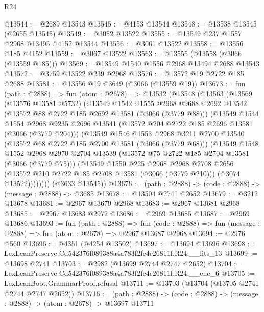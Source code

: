 \begin{lexlean}{R24}
\begin{coremodule}
@13544 := @2689 @13543
@13545 := @4153 @13544
@13548 := @13538 @13545 (@2655 @13545)
@13549 := @3052 @13522
@13555 := @13549 @237 @1557 @2968 @13495 @4152 @13544
@13556 := @3061 @13522
@13558 := @13556 @185 @4152
@13559 := @3067 @13522
@13563 := @13555 (@13558 (@3066 (@13559 @185)))
@13569 := @13549 @1540 @1556 @2968 @13494 @2688 @13543
@13572 := @3759 @13522 @239 @2968
@13576 := @13572 @19 @2722 @185 @2688
@13581 := @13556 @19 @3649 (@3066 (@13559 @19))
@13673 := fun (path : @2888) =>
  fun (atom : @2678) =>
  @13532
    (@13548
      (@13563
        (@13569
          (@13576 @13581 @5732)
          (@13549
            @1542
            @1555
            @2968
            @9688
            @2692
            @13542
            (@13572 @88 @2722 @185 @2692 @13581 (@3066 (@3779 @88)))
            (@13549
              @1544
              @1554
              @2968
              @9235
              @2696
              @13541
              (@13572 @204 @2722 @185 @2696 @13581 (@3066 (@3779 @204)))
              (@13549
                @1546
                @1553
                @2968
                @3211
                @2700
                @13540
                (@13572 @68 @2722 @185 @2700 @13581 (@3066 (@3779 @68)))
                (@13549
                  @1548
                  @1552
                  @2968
                  @2970
                  @2704
                  @13539
                  (@13572 @75 @2722 @185 @2704 @13581 (@3066 (@3779 @75)))
                  (@13549
                    @1550
                    @225
                    @2968
                    @2968
                    @2708
                    @2656
                    (@13572 @210 @2722 @185 @2708 @13581 (@3066 (@3779 @210)))
                    (@3074 @13522))))))))
      (@3633 @13545))
@13676 := (path : @2888) -> (code : @2888) -> (message : @2888) -> @3685
@13678 := @13504 @2741 @2652
@13679 := @3212 @13678
@13681 := @2967 @13679 @2968
@13683 := @2967 @13681 @2968
@13685 := @2967 @13683 @2972
@13686 := @2969 @13685
@13687 := @2969 @13686
@13693 := fun (path : @2888) =>
  fun (code : @2888) => fun (message : @2888) => fun (atom : @2678) => @2967 @13687 @2968
@13694 := @2976 @560
@13696 := @4351 (@4254 @13502)
@13697 := @13694 @13696
@13698 := LexLeanPreserve.Cd542376f089388a4a783f2fc4c26811f.R24.__fits_13
@13699 := @13698 @2741
@13703 := @2982 (@13699 @2744 @2747 @2652)
@13704 := LexLeanPreserve.Cd542376f089388a4a783f2fc4c26811f.R24.__enc_6
@13705 := LexLeanBoot.GrammarProof.refusal
@13711 := @13703 (@13704 (@13705 @2741 @2744 @2747 @2652))
@13716 := (path : @2888) -> (code : @2888) -> (message : @2888) -> (atom : @2678) -> @13697 @13711

\end{coremodule}
\end{lexlean}
